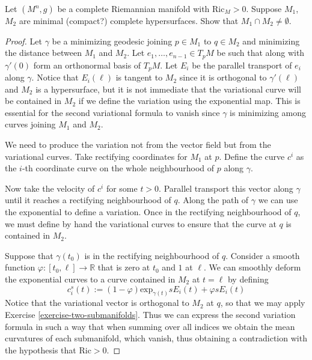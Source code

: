 \begin{exercise}
\label{exercise-intersecting-minimal-hypersurfaces}
Let $(M^n,g)$ be a complete Riemannian manifold with $\text{Ric}_M>0$. 
Suppose $M_1$, $M_2$ are minimal (compact?) complete hypersurfaces. Show that 
$M_1 \cap M_2 \neq \emptyset$.
\end{exercise}

\begin{proof}
Let $\gamma$ be a minimizing geodesic joining $p \in M_1$ to $q\in M_2$ and
minimizing the distance between $M_1$ and $M_2$. Let $e_1,\ldots,e_{n-1}\in
T_pM$ be such that along with $\gamma'(0)$ form an orthonormal basis of $T_pM$.
Let $E_i$ be the parallel transport of $e_i$ along $\gamma$. Notice that
$E_i(\ell)$ is tangent to $M_2$ since it is orthogonal to $\gamma'(\ell)$ and
$M_2$ is a hypersurface, but it is not immediate that the variational curve will
be contained in $M_2$ if we define the variation using the exponential map. This
is essential for the second variational formula to vanish since $\gamma$ is
minimizing among curves joining $M_1$ and $M_2$.

We need to produce the variation not from the vector field but from the
variational curves. Take rectifying coordinates for $M_1$ at $p$. Define the
curve $c^i$ as the $i$-th coordinate curve on the whole neighbourhood of $p$
along $\gamma$.

Now take the velocity of $c^i$ for some $t>0$. Parallel transport this vector
along $\gamma$ until it reaches a rectifying neighbourhood of $q$. Along the
path of $\gamma$ we can use the exponential to define a variation. Once in the
rectifying neighbourhood of $q$, we must define by hand the variational curves
to ensure that the curve at $q$ is contained in $M_2$.

Suppose that $\gamma(t_0)$ is in the rectifying neighbourhood of $q$. Consider a
smooth function $\varphi:[t_0,\ell]\to \mathbb{R}$ that is zero at $t_0$ and $1$
at $\ell$. We can smoothly deform the exponential curves to a curve contained in
$M_2$ at $t=\ell$ by defining 
$$
c^s_i(t):=(1-\varphi)\text{exp}_{\gamma(t)}sE_i(t)+\varphi sE_i(t)
$$ 
Notice that the variational vector is orthogonal to $M_2$ at $q$, so that we may
apply Exercise \ref{exercise-two-submanifolds}. Thus we can express the second
variation formula in such a way that when summing over all indices we obtain the
mean curvatures of each submanifold, which vanish, thus obtaining a
contradiction with the hypothesis that $\text{Ric}>0$.
\end{proof}

